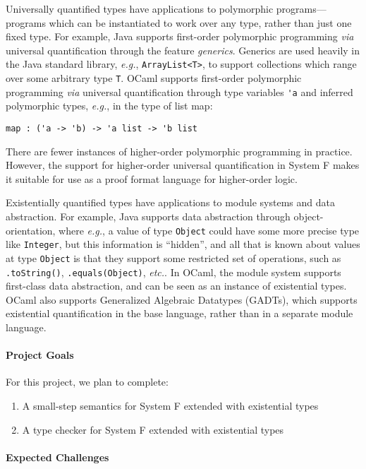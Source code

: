 \documentclass{article}
\begin{document}
Universally quantified types have applications to polymorphic
programs---programs which can be instantiated to work over any type, rather
than just one fixed type. For example, Java supports first-order polymorphic
programming \textit{via} universal quantification through the feature
\textit{generics}. Generics are used heavily in the Java standard library,
\emph{e.g.}, \verb|ArrayList<T>|, to support collections which range over some
arbitrary type \verb|T|. OCaml supports first-order polymorphic programming
\textit{via} universal quantification through type variables \verb|'a| and
inferred polymorphic types, \emph{e.g.}, in the type of list map:
\begin{verbatim}
map : ('a -> 'b) -> 'a list -> 'b list
\end{verbatim}

There are fewer instances of higher-order polymorphic programming in practice.
However, the support for higher-order universal quantification in System F
makes it suitable for use as a proof format language for higher-order logic.

Existentially quantified types have applications to module systems and data
abstraction. For example, Java supports data abstraction through
object-orientation, where \emph{e.g.}, a value of type \verb|Object| could have
some more precise type like \verb|Integer|, but this information is ``hidden'',
and all that is known about values at type \verb|Object| is that they support
some restricted set of operations, such as \verb|.toString()|,
\verb|.equals(Object)|, \emph{etc.}. In OCaml, the module system supports
first-class data abstraction, and can be seen as an instance of existential
types. OCaml also supports Generalized Algebraic Datatypes (GADTs), which
supports existential quantification in the base language, rather than in a
separate module language.

\paragraph{Project Goals}

For this project, we plan to complete:
\begin{enumerate}
\item A small-step semantics for System F extended with existential types
\item A type checker for System F extended with existential types
\end{enumerate}

\paragraph{Expected Challenges}
\end{document}

